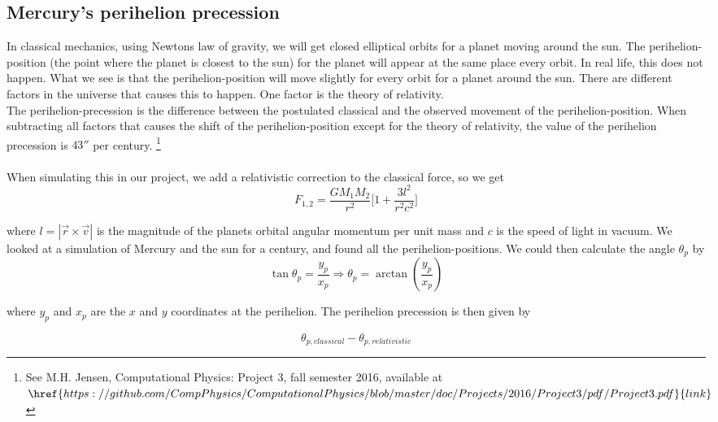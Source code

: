 \documentclass[%
 reprint,
 nobalance,
 amsmath,amssymb,
 aps,
]{revtex4-1}
\begin{document}
\subsection{\label{sec:Thi} Mercury's perihelion precession}

In classical mechanics, using Newtons law of gravity, we will get closed elliptical orbits for a planet moving around the sun. The perihelion-position (the point where the planet is closest to the sun) for the planet will appear at the same place every orbit. In real life, this does not happen. What we see is that the perihelion-position will move slightly for every orbit for a planet around the sun. There are different factors in the universe that causes this to happen. One factor is the theory of relativity. \\
The perihelion-precession is the difference between the postulated classical and the observed movement of the perihelion-position. When subtracting all factors that causes the shift of the perihelion-position except for the theory of relativity, the value of the perihelion precession is $43''$ per century. \footnote{See M.H. Jensen, Computational Physics: Project 3, fall semester 2016, available at $\href{https://github.com/CompPhysics/ComputationalPhysics/blob/master/doc/Projects/2016/Project3/pdf/Project3.pdf}{link}$}
\\\\
When simulating this in our project, we add a relativistic correction to the classical force, so we get
\begin{equation}\label{eq:force_relCorr}
F_{1,2} = \frac{GM_1M_2}{r^2}\bigg[ 1 + \frac{3l^2}{r^2c^2}\bigg]
\end{equation}

where $l = |\vec{r} \times \vec{v}|$ is the magnitude of the planets orbital angular momentum per unit mass and $c$ is the speed of light in vacuum. We looked at a simulation of Mercury and the sun for a century, and found all the perihelion-positions. We could then calculate the angle $\theta_p$ by 
\begin{equation}\label{eq:per_prec}
\tan \theta_p = \frac{y_p}{x_p} \Rightarrow \theta_p = \arctan(\frac{y_p}{x_p})
\end{equation}

where $y_p$ and $x_p$ are the $x$ and $y$ coordinates at the perihelion. The perihelion precession is then given by

\begin{equation}\label{eq:per_prec2}
\theta_{p, classical} - \theta_{p, relativistic}
\end{equation}
\end{document}
